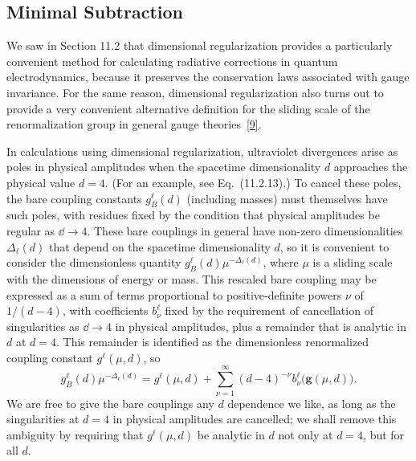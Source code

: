 
\subsection{Minimal Subtraction}
\label{sec:18.6}

We saw in Section 11.2 that dimensional regularization provides a particularly convenient method for calculating radiative corrections in quantum electrodynamics, because it preserves the conservation laws associated with gauge invariance. For the same reason, dimensional regularization also turns out to provide a very convenient alternative definition for the sliding scale of the renormalization group in general gauge theories~\hyperref[ch18-ref-9]{[9]}.

In calculations using dimensional regularization, ultraviolet divergences arise as poles in physical amplitudes when the spacetime dimensionality $d$ approaches the physical value $d=4$. (For an example, see Eq.~(11.2.13).) To cancel these poles, the bare coupling constants $g_B^\ell(d)$ (including masses) must themselves have such poles, with residues fixed by the condition that physical amplitudes be regular as $\dd\to4$. These bare couplings in general have non-zero dimensionalities $\Delta_\ell(d)$ that depend on the spacetime dimensionality $d$, so it is convenient to consider the dimensionless quantity $g_B^\ell(d)\mu^{-\Delta_\ell(d)}$, where $\mu$ is a sliding scale with the dimensions of energy or mass. This rescaled bare coupling may be expressed as a sum of terms proportional to positive-definite powers $\nu$ of $1/(d-4)$, with coefficients $b_\nu^\ell$ fixed by the requirement of cancellation of singularities as $\dd\to4$ in physical amplitudes, plus a remainder that is analytic in $d$ at $d=4$. This remainder is identified as the dimensionless renormalized coupling constant $g^\ell(\mu,d)$, so
\begin{equation}
g_B^\ell(d)\mu^{-\Delta_\ell(d)}
=g^\ell(\mu,d)+\sum_{\nu=1}^{\infty}(d-4)^{-\nu}
b_\nu^\ell\bigl(\mathbf{g}(\mu,d)\bigr).
\tag{18.6.1}\label{eq:18.6.1}
\end{equation}
We are free to give the bare couplings any $d$ dependence we like, as long as the singularities at $d=4$ in physical amplitudes are cancelled; we shall remove this ambiguity by requiring that $g^\ell(\mu,d)$ be analytic in $d$ not only at $d=4$, but for all $d$.

